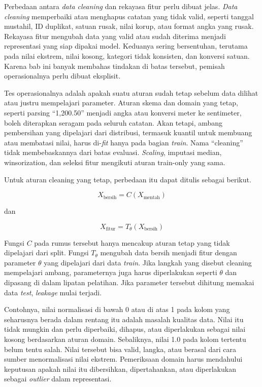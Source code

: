 Perbedaan antara \emph{data cleaning} dan rekayasa fitur perlu dibuat jelas. \emph{Data cleaning} memperbaiki atau menghapus catatan yang tidak valid, seperti tanggal mustahil, ID duplikat, satuan rusak, nilai korup, atau format angka yang rusak. Rekayasa fitur mengubah data yang valid atau sudah diterima menjadi representasi yang siap dipakai model. Keduanya sering bersentuhan, terutama pada nilai ekstrem, nilai kosong, kategori tidak konsisten, dan konversi satuan. Karena bab ini banyak membahas tindakan di batas tersebut, pemisah operasionalnya perlu dibuat eksplisit.

Tes operasionalnya adalah apakah suatu aturan sudah tetap sebelum data dilihat atau justru mempelajari parameter. Aturan skema dan domain yang tetap, seperti parsing ``1,200.50'' menjadi angka atau konversi meter ke sentimeter, boleh diterapkan seragam pada seluruh catatan. Akan tetapi, ambang pembersihan yang dipelajari dari distribusi, termasuk kuantil untuk membuang atau membatasi nilai, harus di-\emph{fit} hanya pada bagian \emph{train}. Nama ``cleaning'' tidak membebaskannya dari batas evaluasi. \emph{Scaling}, imputasi median, winsorization, dan seleksi fitur mengikuti aturan train-only yang sama.

Untuk aturan cleaning yang tetap, perbedaan itu dapat ditulis sebagai berikut.

\[
X_{\text{bersih}} = C(X_{\text{mentah}})
\]

dan

\[
X_{\text{fitur}} = T_{\theta}(X_{\text{bersih}})
\]

Fungsi \(C\) pada rumus tersebut hanya mencakup aturan tetap yang tidak dipelajari dari split. Fungsi \(T_{\theta}\) mengubah data bersih menjadi fitur dengan parameter \(\theta\) yang dipelajari dari data \emph{train}. Jika langkah yang disebut cleaning mempelajari ambang, parameternya juga harus diperlakukan seperti \(\theta\) dan dipasang di dalam lipatan pelatihan. Jika parameter tersebut dihitung memakai data \emph{test}, \emph{leakage} mulai terjadi.

Contohnya, nilai normalisasi di bawah 0 atau di atas 1 pada kolom yang seharusnya berada dalam rentang itu adalah masalah kualitas data. Nilai itu tidak mungkin dan perlu diperbaiki, dihapus, atau diperlakukan sebagai nilai kosong berdasarkan aturan domain. Sebaliknya, nilai 1.0 pada kolom tertentu belum tentu salah. Nilai tersebut bisa valid, langka, atau berasal dari cara sumber menormalisasi nilai ekstrem. Pemeriksaan domain harus mendahului keputusan apakah nilai itu dibersihkan, dipertahankan, atau diperlakukan sebagai \emph{outlier} dalam representasi.

